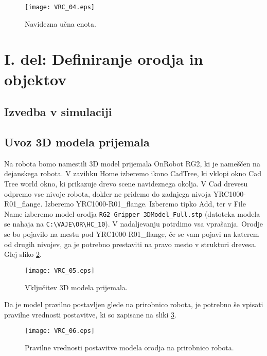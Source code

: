 \begin{figure}[hbt]
	\centering
	\texttt{[image: VRC\_04.eps]}
	\caption{Navidezna učna enota.}
	\label{fig:VRC_04}
\end{figure}

\clearpage

\section{I. del: Definiranje orodja in objektov}

\subsection{Izvedba v simulaciji} \label{sim1}

\subsection*{Uvoz 3D modela prijemala}

Na robota bomo namestili 3D model prijemala OnRobot RG2, ki je nameščen na dejanskega robota. V zavihku Home izberemo ikono CadTree, ki vklopi okno Cad Tree world okno, ki prikazuje drevo scene navideznega okolja. V Cad drevesu odpremo vse nivoje robota, dokler ne pridemo do zadnjega nivoja YRC1000-R01\_flange. Izberemo  YRC1000-R01\_flange. Izberemo tipko Add, ter v File Name izberemo model orodja \verb|RG2 Gripper 3DModel_Full.stp| (datoteka modela se nahaja na \verb|C:\VAJE\OR\HC_10|). V nadaljevanju potrdimo vsa vprašanja. Orodje se bo pojavilo na mestu pod YRC1000-R01\_flange, če se vam pojavi na katerem od drugih nivojev, ga je potrebno prestaviti na pravo mesto v strukturi drevesa. Glej sliko \ref{fig:VRC_05}.

\begin{figure}[hbt]
	\centering
	\texttt{[image: VRC\_05.eps]}
	\caption{Vključitev 3D modela prijemala.}
	\label{fig:VRC_05}
\end{figure}

Da je model pravilno postavljen glede na prirobnico robota, je potrebno še vpisati pravilne vrednosti postavitve, ki so zapisane na sliki \ref{fig:VRC_06}.

\begin{figure}[hbt]
	\centering
	\texttt{[image: VRC\_06.eps]}
	\caption{Pravilne vrednosti postavitve modela orodja na prirobnico robota.}
	\label{fig:VRC_06}
\end{figure}

